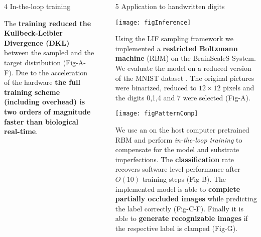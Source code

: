 \begin{frame}
\begin{columns}
\begin{column}{0.99\textwidth}
\begin{columns}[t]
\begin{column}{0.32\textwidth}
\begin{block}{\large 4 In-the-loop training}
					\begin{adjustwidth}{1.cm}{1.cm}
					\justify
					
					The \textbf{training reduced the Kullbeck-Leibler Divergence (DKL)} between the sampled and the target distribution (Fig-A-F).
					Due to the acceleration of the hardware \textbf{the full training scheme (including overhead) is two orders of magnitude faster than biological real-time}.
					\end{adjustwidth}

					\blockSpaceOne
					\end{block}





				\end{column}

				\begin{column}{.01\textwidth}\end{column}

				\begin{column}{0.32\textwidth}

					\begin{block}{\large 5 Application to handwritten digits}
					\blockSpaceTwo

					\begin{center}
						\texttt{[image: figInference]}
					\end{center}
					\thirdBlockImSpace

					\begin{adjustwidth}{1.cm}{1.cm}
					\justify
					 Using the LIF sampling framework we implemented a \textbf{restricted Boltzmann machine} (RBM) \cite{hinton1984boltzmann} on the BrainScaleS System.
					 We evaluate the model on a reduced version of the MNIST dataset \cite{lecun1998gradient}.
					 The original pictures were binarized, reduced to $12\times12$ pixels and the digits 0,1,4 and 7 were selected (Fig-A).
					\end{adjustwidth}

					\thirdBlockImSpace
					\begin{center}
						\texttt{[image: figPatternComp]}
					\end{center}
					\thirdBlockImSpace


					\begin{adjustwidth}{1.cm}{1.cm}
					\justify
					We use an on the host computer pretrained RBM and perform \textit{in-the-loop training } to compensate for the model and substrate imperfections.
					The \textbf{classification} rate recovers software level performance after $O(10)$ training steps (Fig-B).
					The implemented model is able to \textbf{complete partially occluded images} while predicting the label correctly (Fig-C-F).
					Finally it is able to \textbf{generate recognizable images} if the respective label is clamped (Fig-G).


\end{adjustwidth}
\end{block}
\end{column}
\end{columns}
\end{column}
\end{columns}
\end{frame}
